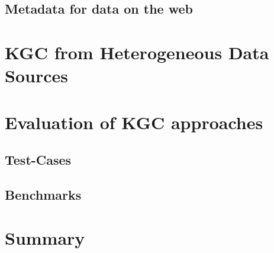 \subsection{Metadata for data on the web}


\section{KGC from Heterogeneous Data Sources}

\section{Evaluation of KGC approaches}

\subsection{Test-Cases}
\subsection{Benchmarks}



\section{Summary}
